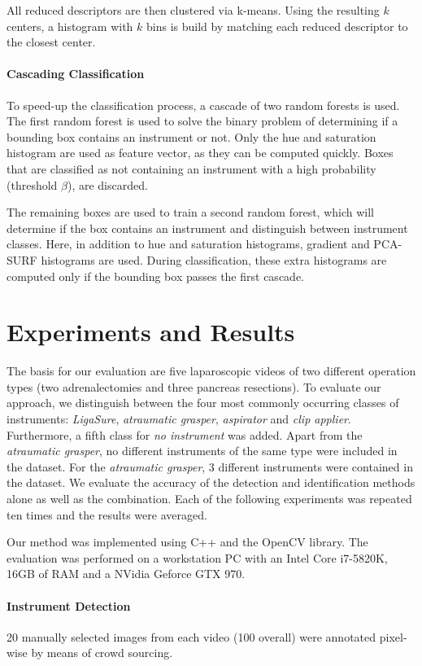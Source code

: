 \documentclass{llncs}
\begin{document}
All reduced descriptors are then clustered via k-means.
Using the resulting $k$ centers, a histogram with $k$ bins is build by matching each reduced descriptor to the closest center.
\paragraph{Cascading Classification}
To speed-up the classification process, a cascade of two random forests is used.
The first random forest is used to solve the binary problem of determining if a bounding box contains an instrument or not.
Only the hue and saturation histogram are used as feature vector, as they can be computed quickly.
Boxes that are classified as not containing an instrument with a high probability (threshold $\beta$), are discarded.

The remaining boxes are used to train a second random forest, which will determine if the box contains an instrument and distinguish between instrument classes.
Here, in addition to hue and saturation histograms, gradient and PCA-SURF histograms are used.
During classification, these extra histograms are computed only if the bounding box passes the first cascade.
\section{Experiments and Results}
The basis for our evaluation are five laparoscopic videos of two different operation types (two adrenalectomies and three pancreas resections).
To evaluate our approach, we distinguish between the four most commonly occurring classes of instruments: \textit{LigaSure}, \textit{atraumatic grasper}, \textit{aspirator} and \textit{clip applier}.
Furthermore, a fifth class for \textit{no instrument} was added.
Apart from the \textit{atraumatic grasper}, no different instruments of the same type were included in the dataset.
For the \textit{atraumatic grasper}, 3 different instruments were contained in the dataset.
We evaluate the accuracy of the detection and identification methods alone as well as the combination.
Each of the following experiments was repeated ten times and the results were averaged.

Our method was implemented using C++ and the OpenCV library\cite{opencv_library}. 
The evaluation was performed on a workstation PC with an Intel Core i7-5820K, 16GB of RAM and a NVidia Geforce GTX 970.
\paragraph{Instrument Detection}
20 manually selected images from each video (100 overall) were annotated pixel-wise by means of crowd sourcing\cite{maier2013can}.
\end{document}
